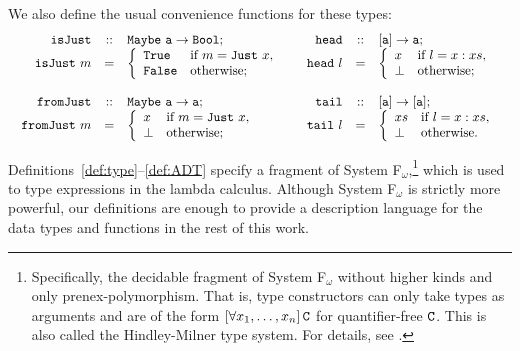 \noindent
We also define the usual convenience functions for these types:
$$
\begin{array}{l l}
\begin{array}{r c l}
\mathtt{isJust} & :: & \mathtt{Maybe\ a \rightarrow Bool};\\
\mathtt{isJust}\ m & = & \left\{
\begin{array}{l l}
\mathtt{True} & \textnormal{if } m = \mathtt{Just}\ x,\\
\mathtt{False} & \textnormal{otherwise};\\
\end{array}
\right.\\
\\
\mathtt{fromJust} & :: & \mathtt{Maybe\ a \rightarrow a};\\
\mathtt{fromJust}\ m & = & \left\{
\begin{array}{l l}
x & \textnormal{if } m = \mathtt{Just}\ x,\\
\bot & \textnormal{otherwise};\\
\end{array}
\right.\\
\end{array}
&
\begin{array}{r c l}
\mathtt{head} & :: & \mathtt{[a] \rightarrow a};\\
\mathtt{head}\ l & = & \left\{
\begin{array}{l l}
x & \textnormal{if } l = x:xs,\\
\bot & \textnormal{otherwise};\\
\end{array}
\right.\\
\\
\mathtt{tail} & :: & \mathtt{[a] \rightarrow [a]};\\
\mathtt{tail}\ l & = & \left\{
\begin{array}{l l}
xs & \textnormal{if } l = x:xs,\\
\bot & \textnormal{otherwise}.\\
\end{array}
\right.\\
\end{array}
\end{array}
$$

Definitions~\ref{def:type}--\ref{def:ADT} specify a fragment of System F$_\omega$,\footnote{Specifically, the decidable fragment of System F$_\omega$ without higher kinds and only prenex-polymorphism. That is, type constructors can only take types as arguments and are of the form $\left[\forall x_1,\dots,x_n \right] \mathtt{C}$ for quantifier-free $\mathtt{C}$. This is also called the Hindley-Milner type system. For details, see \cite{barendregt91}.} which is used to type expressions in the lambda calculus. Although System F$_\omega$ is strictly more powerful, our definitions are enough to provide a description language for the data types and functions in the rest of this work.


